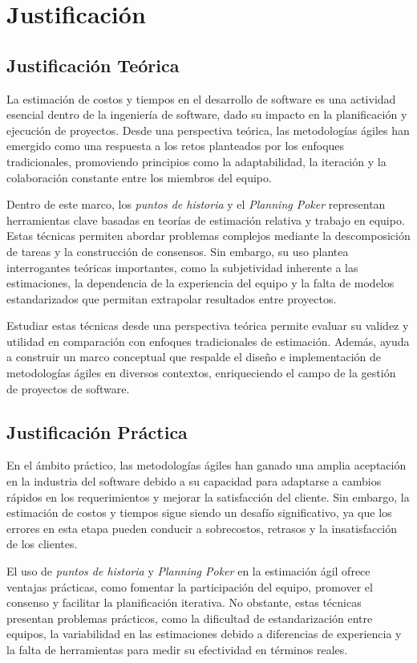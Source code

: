 \chapter{Justificación}
\section{Justificación Teórica}

La estimación de costos y tiempos en el desarrollo de software es una actividad esencial dentro de la ingeniería de software, dado su impacto en la planificación y ejecución de proyectos. Desde una perspectiva teórica, las metodologías ágiles han emergido como una respuesta a los retos planteados por los enfoques tradicionales, promoviendo principios como la adaptabilidad, la iteración y la colaboración constante entre los miembros del equipo.

Dentro de este marco, los \textit{puntos de historia} y el \textit{Planning Poker} representan herramientas clave basadas en teorías de estimación relativa y trabajo en equipo. Estas técnicas permiten abordar problemas complejos mediante la descomposición de tareas y la construcción de consensos. Sin embargo, su uso plantea interrogantes teóricas importantes, como la subjetividad inherente a las estimaciones, la dependencia de la experiencia del equipo y la falta de modelos estandarizados que permitan extrapolar resultados entre proyectos.

Estudiar estas técnicas desde una perspectiva teórica permite evaluar su validez y utilidad en comparación con enfoques tradicionales de estimación. Además, ayuda a construir un marco conceptual que respalde el diseño e implementación de metodologías ágiles en diversos contextos, enriqueciendo el campo de la gestión de proyectos de software.

\section{Justificación Práctica}

En el ámbito práctico, las metodologías ágiles han ganado una amplia aceptación en la industria del software debido a su capacidad para adaptarse a cambios rápidos en los requerimientos y mejorar la satisfacción del cliente. Sin embargo, la estimación de costos y tiempos sigue siendo un desafío significativo, ya que los errores en esta etapa pueden conducir a sobrecostos, retrasos y la insatisfacción de los clientes.

El uso de \textit{puntos de historia} y \textit{Planning Poker} en la estimación ágil ofrece ventajas prácticas, como fomentar la participación del equipo, promover el consenso y facilitar la planificación iterativa. No obstante, estas técnicas presentan problemas prácticos, como la dificultad de estandarización entre equipos, la variabilidad en las estimaciones debido a diferencias de experiencia y la falta de herramientas para medir su efectividad en términos reales.

